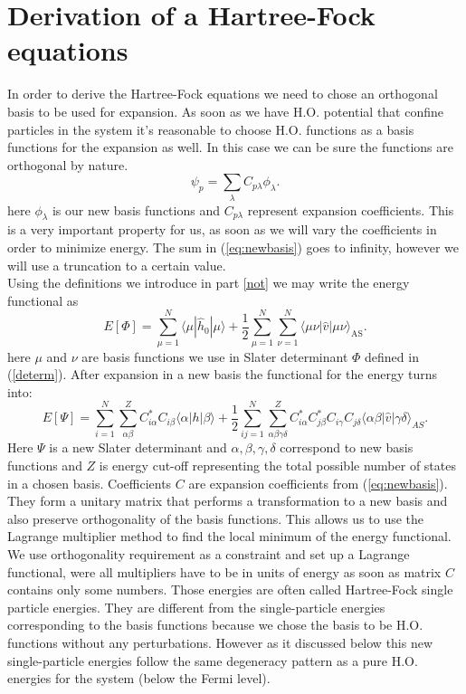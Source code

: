 \documentclass[twoside,english]{uiofysmaster}
\theoremstyle{definition}
\begin{document}
\section{Derivation of a Hartree-Fock equations}
In order to derive the Hartree-Fock equations we need to chose an orthogonal basis to be used for expansion. As soon as we have H.O. potential that confine particles in the system it's reasonable to choose H.O. functions as a basis functions for the expansion as well. In this case we can be sure the functions are orthogonal by nature. 
\begin{equation}
\psi_p  = \sum_{\lambda} C_{p\lambda}\phi_{\lambda}. \label{eq:newbasis}
\end{equation}
here $\phi_{\lambda}$ is our new basis functions and $C_{p\lambda}$ represent expansion coefficients. This is a very important property for us, as soon as we will vary the coefficients in order to minimize energy. The sum in (\ref{eq:newbasis}) goes to infinity, however we will use a truncation to a certain value. \\
Using the definitions we introduce in part \ref{not} we may write the energy functional as
\begin{equation}
E[\Phi] 
= \sum_{\mu=1}^N \langle \mu | \hat{h}_0 | \mu \rangle +
\frac{1}{2}\sum_{{\mu}=1}^N\sum_{{\nu}=1}^N \langle \mu\nu|\hat{v}|\mu\nu\rangle_{\mathrm{AS}}.
\label{FunctionalEPhi}
\end{equation}
here $\mu$ and $\nu$ are basis functions we use in Slater determinant $\Phi$ defined in (\ref{determ}). After expansion in a new basis the functional for the energy turns into:
\begin{equation}
E[\Psi] 
= \sum_{i=1}^N \sum_{\alpha\beta}^Z C^*_{i\alpha}C_{i\beta}\langle \alpha | h | \beta \rangle +
\frac{1}{2}\sum_{ij=1}^N\sum_{{\alpha\beta\gamma\delta}}^Z C^*_{i\alpha}C^*_{j\beta}C_{i\gamma}C_{j\delta}\langle \alpha\beta|\hat{v}|\gamma\delta\rangle_{AS}. \label{FunctionalEPhi3}
\end{equation}
Here $\Psi$ is a new Slater determinant and $\alpha,\beta,\gamma,\delta$ correspond to new basis functions and $Z$ is energy cut-off representing the total possible number of states in a chosen basis. Coefficients $C$ are expansion coefficients from (\ref{eq:newbasis}). They form a unitary matrix that performs a transformation to a new basis and also preserve orthogonality of the basis functions. This allows us to use the Lagrange multiplier method to find the local minimum of the energy functional. We use orthogonality requirement as a constraint and set up a Lagrange functional, were all multipliers have to be in units of energy as soon as matrix $C$ contains only some numbers. Those energies are often called Hartree-Fock single particle energies. They are different from the single-particle energies corresponding to the basis functions because we chose the basis to be H.O. functions without any perturbations. However as it discussed below this new single-particle energies follow the same degeneracy pattern as a pure H.O. energies for the system (below the Fermi level). 
\end{document}
